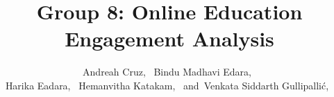 %
%






\documentclass[journal]{IEEEtran}

\usepackage{xcolor,soul,framed} %

\usepackage[pdftex]{graphicx}
\graphicspath{{../pdf/}{../jpeg/}}

\usepackage[cmex10]{amsmath}
\usepackage{array}
\usepackage{mdwmath}
\usepackage{mdwtab}
\usepackage{eqparbox}
\usepackage{url}
\usepackage{amsmath, amssymb}
\usepackage{graphicx}
\usepackage{hyperref}
\usepackage{cite}




    \title{Group 8: Online Education Engagement Analysis}
  \author{Andreah Cruz,~
      Bindu Madhavi Edara,~\\
      Harika Eadara,~
      Hemanvitha Katakam,~
      and~Venkata Siddarth Gullipalli\'c,~%


  }  




\maketitle



